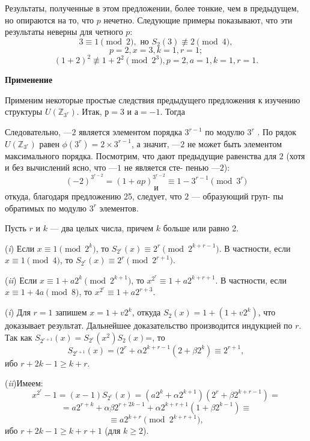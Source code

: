 \begin{mynotice}
Результаты, полученные в этом предложении, более\linebreak
тонкие, чем в предыдущем, но опираются на то, что $p$ нечетно.\linebreak
Следующие примеры показывают, что эти результаты неверны\linebreak
для четного $p$:
$$3\equiv 1\pmod{2}, \text{ но } S_2(3) \not\equiv 2 \pmod{4},$$
$$p = 2, x = 3, k = 1, r = 1;$$
$$(1 + 2)^2 \not\equiv 1 + 2^2\pmod{2^3}, p = 2, a = 1, k = 1, r = 1.$$
\end{mynotice}
\begin{beznomera}
\noindent \textbf{Применение}

Применим некоторые простые следствия предыдущего предложения\linebreak
к изучению структуры $U(\mathbb{Z}_{3^r})$. Итак, $р = 3$ и $а = - 1$. Тогда

Следовательно, $—2$ является элементом порядка $3^{r-1}$ по модулю $3^r$ . По­\linebreak
рядок $U(\mathbb{Z}_{3^r})$ равен $\phi (3^r) = 2 \times 3^{r-1}$, а значит, $—2$ не может быть\linebreak
элементом максимального порядка. Посмотрим, что дают предыдущие\linebreak
равенства для $2$ (хотя и без вычислений ясно, что $—1$ не является сте­-\linebreak
пенью $—2$):
$$(-2)^{3^{r-2}} = (1+ ap)^{3^{r-2}} \equiv 1 - 3^{r-1} \pmod{3^r}$$
$$\text{ и }$$
\noindent откуда, благодаря предложению 25, следует, что $2$ — образующий груп-\linebreak­
пы обратимых по модулю $3^r$ элементов.
\end{beznomera}
\begin{predl}
Пусть $r$ и $k$ — два целых числа, причем $k$ больше или равно 2.
\par (\textit{i}) Если $x \equiv 1 \pmod{2^k}$, то $S_{2^r}(x) \equiv 2^r \pmod{2^{k+r-1}}$. В частности,\linebreak
если $x \equiv 1 \pmod{4}$, то $S_{2^r}(x) \equiv 2^r \pmod{2^{r+1}}$.
\par (\textit{ii}) Если $x \equiv 1 + a2^k \pmod{2^{k+1}}$, то $x^{2^r} \equiv 1 + a2^{k+r+1}$.\linebreak
В частности, если $x \equiv 1 + 4a \pmod{8}$, то $x^{2^r} \equiv 1 + a2^{r+3}$.
\end{predl}
\begin{myproof}
\par (\textit{i}) Для $r = 1$ запишем $x = 1 + v2^k$, откуда $S_2(x) = 1 + (1+v2^k)$,\linebreak
что доказывает результат. Дальнейшее доказательство производится\linebreak
индукцией по $r$. Так как $S_{2^{r+1}}(x)= S_{2^{r}}(x^2)S_2(x)$=, то 
$$S_{2^{r+1}}(x)=(2^r+\alpha 2^{k+r-1}(2+\beta 2^{k})\equiv 2^{r+1},$$
ибо $r + 2k -1 \ge k + r$.
\par (\textit{ii})Имеем:
$$x^{2^r} - 1 = (x - 1)S_{2^r}(x) = (a2^{k} + \alpha 2^{k+1})(2^r+\beta 2^{k+r-1})=$$
$$= a2^{r+k}+\alpha \beta 2^{r +2k -1} + \alpha 2^{k+r+1}(1+\beta 2^{k-1})\equiv$$
$$\equiv a2^{k+r}\pmod{2^{k+r+1}},$$
ибо $r+2k-1\ge k + r +1$ (для $k \ge 2$).
\end{myproof}
